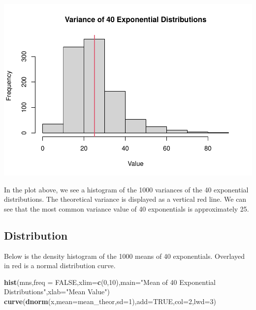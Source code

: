\documentclass[
]{article}
\newenvironment{Shaded}{\begin{snugshade}}{\end{snugshade}}
\newcommand{\DataTypeTok}[1]{\textcolor[rgb]{0.13,0.29,0.53}{#1}}
\newcommand{\DecValTok}[1]{\textcolor[rgb]{0.00,0.00,0.81}{#1}}
\newcommand{\KeywordTok}[1]{\textcolor[rgb]{0.13,0.29,0.53}{\textbf{#1}}}
\newcommand{\NormalTok}[1]{#1}
\newcommand{\OtherTok}[1]{\textcolor[rgb]{0.56,0.35,0.01}{#1}}
\newcommand{\StringTok}[1]{\textcolor[rgb]{0.31,0.60,0.02}{#1}}
\begin{document}
\includegraphics{Statistical-Inference-Project_files/figure-latex/unnamed-chunk-5-1.pdf}

In the plot above, we see a histogram of the 1000 variances of the 40
exponential distributions. The theoretical variance is displayed as a
vertical red line. We can see that the most common variance value of 40
exponentials is approximately 25.

\hypertarget{distribution}{%
\subsection{Distribution}\label{distribution}}

Below is the density histogram of the 1000 means of 40 exponentials.
Overlayed in red is a normal distribution curve.

\begin{Shaded}
\begin{Highlighting}[]
\KeywordTok{hist}\NormalTok{(mns,}\DataTypeTok{freq =} \OtherTok{FALSE}\NormalTok{,}\DataTypeTok{xlim=}\KeywordTok{c}\NormalTok{(}\DecValTok{0}\NormalTok{,}\DecValTok{10}\NormalTok{),}\DataTypeTok{main=}\StringTok{"Mean of 40 Exponential Distributions"}\NormalTok{,}\DataTypeTok{xlab=}\StringTok{"Mean Value"}\NormalTok{)}
\KeywordTok{curve}\NormalTok{(}\KeywordTok{dnorm}\NormalTok{(x,}\DataTypeTok{mean=}\NormalTok{mean\_theor,}\DataTypeTok{sd=}\DecValTok{1}\NormalTok{),}\DataTypeTok{add=}\OtherTok{TRUE}\NormalTok{,}\DataTypeTok{col=}\DecValTok{2}\NormalTok{,}\DataTypeTok{lwd=}\DecValTok{3}\NormalTok{)}
\end{Highlighting}
\end{Shaded}
\end{document}

